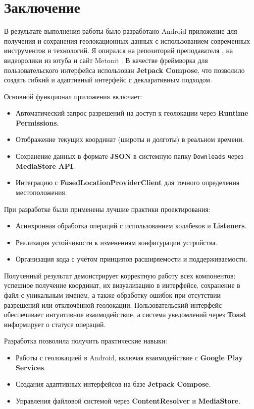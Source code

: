 \chapter*{Заключение}

В результате выполнения работы было разработано Android-приложение для получения и сохранения геолокационных данных с использованием современных инструментов и технологий. Я опирался на репозиторий преподавателя \cite{GitHub}, на видеоролики из ютуба \cite{YouTube} и сайт Metonit \cite{Metanit}. В качестве фреймворка для пользовательского интерфейса использован \textbf{Jetpack Compose}, что позволило создать гибкий и адаптивный интерфейс с декларативным подходом.

Основной функционал приложения включает:
\begin{itemize}
    \item Автоматический запрос разрешений на доступ к геолокации через \textbf{Runtime Permissions}.
    \item Отображение текущих координат (широты и долготы) в реальном времени.
    \item Сохранение данных в формате \textbf{JSON} в системную папку \texttt{Downloads} через \textbf{MediaStore API}.
    \item Интеграцию с \textbf{FusedLocationProviderClient} для точного определения местоположения.
\end{itemize}

При разработке были применены лучшие практики проектирования:
\begin{itemize}
    \item Асинхронная обработка операций с использованием коллбеков и \textbf{Listeners}.
    \item Реализация устойчивости к изменениям конфигурации устройства.
    \item Организация кода с учётом принципов расширяемости и поддерживаемости.
\end{itemize}

Полученный результат демонстрирует корректную работу всех компонентов: успешное получение координат, их визуализацию в интерфейсе, сохранение в файл с уникальным именем, а также обработку ошибок при отсутствии разрешений или отключённой геолокации. Пользовательский интерфейс обеспечивает интуитивное взаимодействие, а система уведомлений через \textbf{Toast} информирует о статусе операций.

Разработка позволила получить практические навыки:
\begin{itemize}
    \item Работы с геолокацией в Android, включая взаимодействие с \textbf{Google Play Services}.
    \item Создания адаптивных интерфейсов на базе \textbf{Jetpack Compose}.
    \item Управления файловой системой через \textbf{ContentResolver} и \textbf{MediaStore}.
\end{itemize}

